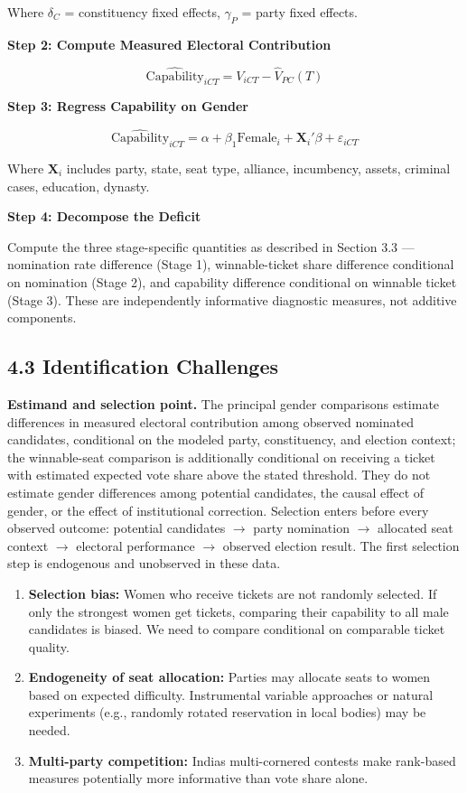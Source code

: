 \documentclass[
]{article}
\begin{document}
Where \(\delta_C\) = constituency fixed effects, \(\gamma_P\) = party fixed effects.

\textbf{Step 2: Compute Measured Electoral Contribution}

\[\widehat{\text{Capability}}_{iCT} = V_{iCT} - \hat{V}_{PC}(T)\]

\textbf{Step 3: Regress Capability on Gender}

\[\widehat{\text{Capability}}_{iCT} = \alpha + \beta_1 \text{Female}_i + \mathbf{X}_i'\beta + \varepsilon_{iCT}\]

Where \(\mathbf{X}_i\) includes party, state, seat type, alliance, incumbency, assets, criminal cases, education, dynasty.

\textbf{Step 4: Decompose the Deficit}

Compute the three stage-specific quantities as described in Section 3.3 --- nomination rate difference (Stage 1), winnable-ticket share difference conditional on nomination (Stage 2), and capability difference conditional on winnable ticket (Stage 3). These are independently informative diagnostic measures, not additive components.

\subsection{4.3 Identification Challenges}\label{43-identification-challenges}

\textbf{Estimand and selection point.} The principal gender comparisons estimate differences in measured electoral contribution among observed nominated candidates, conditional on the modeled party, constituency, and election context; the winnable-seat comparison is additionally conditional on receiving a ticket with estimated expected vote share above the stated threshold. They do not estimate gender differences among potential candidates, the causal effect of gender, or the effect of institutional correction. Selection enters before every observed outcome: potential candidates $\rightarrow$ party nomination $\rightarrow$ allocated seat context $\rightarrow$ electoral performance $\rightarrow$ observed election result. The first selection step is endogenous and unobserved in these data.

\begin{enumerate}
\def\labelenumi{\arabic{enumi}.}
\item
  \textbf{Selection bias:} Women who receive tickets are not randomly selected. If only the strongest women get tickets, comparing their capability to all male candidates is biased. We need to compare conditional on comparable ticket quality.
\item
  \textbf{Endogeneity of seat allocation:} Parties may allocate seats to women based on expected difficulty. Instrumental variable approaches or natural experiments (e.g., randomly rotated reservation in local bodies) may be needed.
\item
  \textbf{Multi-party competition:} India\textquotesingle s multi-cornered contests make rank-based measures potentially more informative than vote share alone.
\end{enumerate}
\end{document}
